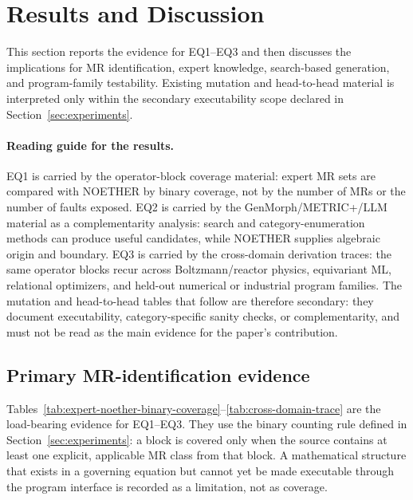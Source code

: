 \documentclass[manuscript]{acmart}
\begin{document}
\section{Results and Discussion}
\label{sec:results-discussion}

This section reports the evidence for EQ1--EQ3 and then discusses the implications for MR identification, expert knowledge, search-based generation, and program-family testability. Existing mutation and head-to-head material is interpreted only within the secondary executability scope declared in Section~\ref{sec:experiments}.

\paragraph{Reading guide for the results.}
EQ1 is carried by the operator-block coverage material: expert MR sets are compared with NOETHER by binary coverage, not by the number of MRs or the number of faults exposed. EQ2 is carried by the GenMorph/METRIC+/LLM material as a complementarity analysis: search and category-enumeration methods can produce useful candidates, while NOETHER supplies algebraic origin and boundary. EQ3 is carried by the cross-domain derivation traces: the same operator blocks recur across Boltzmann/reactor physics, equivariant ML, relational optimizers, and held-out numerical or industrial program families. The mutation and head-to-head tables that follow are therefore secondary: they document executability, category-specific sanity checks, or complementarity, and must not be read as the main evidence for the paper's contribution.

\subsection{Primary MR-identification evidence}
\label{subsec:primary-identification-evidence}

Tables~\ref{tab:expert-noether-binary-coverage}--\ref{tab:cross-domain-trace}
are the load-bearing evidence for EQ1--EQ3. They use the binary counting rule
defined in Section~\ref{sec:experiments}: a block is covered only when the source
contains at least one explicit, applicable MR class from that block. A
mathematical structure that exists in a governing equation but cannot yet be
made executable through the program interface is recorded as a limitation, not
as coverage.
\end{document}
